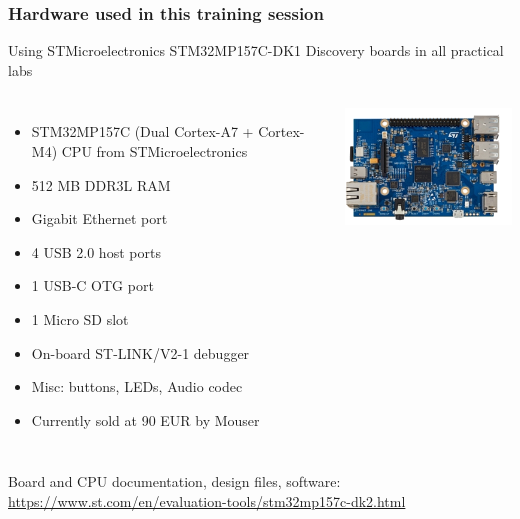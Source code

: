 \begin{frame}
\frametitle{Hardware used in this training session}
  Using STMicroelectronics STM32MP157C-DK1 Discovery boards in all practical labs
  \begin{columns}
    {\footnotesize
    \begin{itemize}
    \item STM32MP157C (Dual Cortex-A7 + Cortex-M4) CPU from STMicroelectronics
    \item 512 MB DDR3L RAM
    \item Gigabit Ethernet port
    \item 4 USB 2.0 host ports
    \item 1 USB-C OTG port
    \item 1 Micro SD slot
    \item On-board ST-LINK/V2-1 debugger
    \item Misc: buttons, LEDs, Audio codec
    \item Currently sold at 90 EUR by Mouser
    \end{itemize}
    }
    \includegraphics[width=\textwidth]{slides/discovery-board-dk1/discovery-board-dk1.png}
  \end{columns}
  \vspace{1em}
  {\small
  Board and CPU documentation, design files, software:
  \url{https://www.st.com/en/evaluation-tools/stm32mp157c-dk2.html}
  }
\end{frame}
